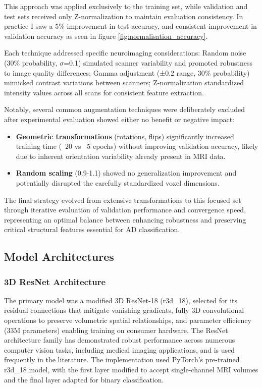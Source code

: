 \documentclass[12pt, a4paper]{article}
\begin{document}
This approach was applied exclusively to the training set, while validation and test sets received only Z-normalization to maintain evaluation consistency. In practice I saw a 5\% improvement in test accuracy, and consistent improvement in validation accuracy as seen in figure \ref{fig:normalisation_accuracy}.

Each technique addressed specific neuroimaging considerations: Random noise (30\% probability, $\sigma$=0.1) simulated scanner variability and promoted robustness to image quality differences; Gamma adjustment (±0.2 range, 30\% probability) mimicked contrast variations between scanners; Z-normalization standardized intensity values across all scans for consistent feature extraction.

Notably, several common augmentation techniques were deliberately excluded after experimental evaluation showed either no benefit or negative impact:

\begin{itemize}
    \item \textbf{Geometric transformations} (rotations, flips) significantly increased training time (~20 vs ~5 epochs) without improving validation accuracy, likely due to inherent orientation variability already present in MRI data.
    
    \item \textbf{Random scaling} (0.9-1.1) showed no generalization improvement and potentially disrupted the carefully standardized voxel dimensions.
\end{itemize}

The final strategy evolved from extensive transformations to this focused set through iterative evaluation of validation performance and convergence speed, representing an optimal balance between enhancing robustness and preserving critical structural features essential for AD classification.
\subsection{Model Architectures}
\subsubsection{3D ResNet Architecture}

The primary model was a modified 3D ResNet-18 (r3d\_18), selected for its residual connections that mitigate vanishing gradients, fully 3D convolutional operations to preserve volumetric spatial relationships, and parameter efficiency (33M parameters) enabling training on consumer hardware. The ResNet architecture family has demonstrated robust performance across numerous computer vision tasks, including medical imaging applications, and is used frequently in the literature. The implementation used PyTorch's pre-trained r3d\_18 model, with the first layer modified to accept single-channel MRI volumes and the final layer adapted for binary classification.
\end{document}
